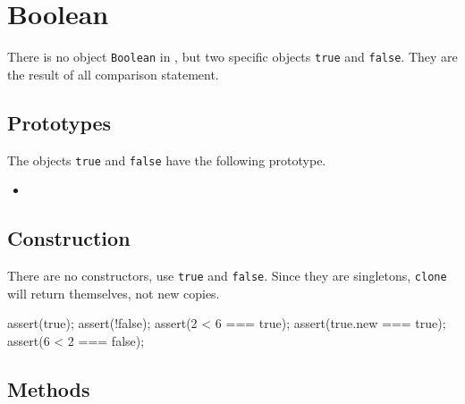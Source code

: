 \section{Boolean}

There is no object \lstinline|Boolean| in \us, but two specific
objects \lstinline|true| and \lstinline|false|.  They are the result
of all comparison statement.


\subsection{Prototypes}

The objects \lstinline|true| and \lstinline|false| have the following
prototype.

\begin{itemize}
\item {}
\end{itemize}

\subsection{Construction}

There are no constructors, use \lstinline|true| and \lstinline|false|.
Since they are singletons, \lstinline|clone| will return themselves,
not new copies.

\begin{urbiscript}
assert(true);
assert(!false);
assert(2 < 6 === true);
assert(true.new === true);
assert(6 < 2 === false);
\end{urbiscript}

\subsection{Methods}


